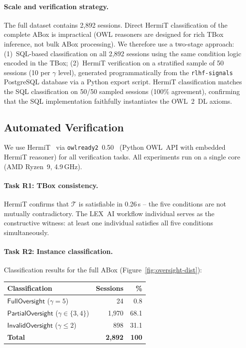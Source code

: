 \documentclass[11pt]{article}
\newcommand{\TBox}{\ensuremath{\mathcal{T}}\xspace}
\begin{document}
\paragraph{Scale and verification strategy.}
The full dataset contains 2{,}892 sessions.
Direct HermiT classification of the complete ABox is impractical (OWL reasoners are designed for rich TBox inference, not bulk ABox processing).
We therefore use a two-stage approach: (1)~SQL-based classification on all 2{,}892 sessions using the same condition logic encoded in the TBox; (2)~HermiT verification on a stratified sample of 50 sessions (10 per $\gamma$ level), generated programmatically from the \texttt{rlhf-signals} PostgreSQL database via a Python export script.
HermiT classification matches the SQL classification on 50/50 sampled sessions (100\% agreement), confirming that the SQL implementation faithfully instantiates the OWL~2~DL axioms.

\subsection{Automated Verification}
\label{sec:verification}

We use HermiT~\citep{glimm2014hermit} via \texttt{owlready2}~0.50~\citep{lamy2017owlready} (Python OWL~API with embedded HermiT reasoner) for all verification tasks.
All experiments run on a single core (AMD Ryzen~9, 4.9\,GHz).

\paragraph{Task R1: TBox consistency.}
HermiT confirms that \TBox is satisfiable in 0.26\,s -- the five conditions are not mutually contradictory.
The LEX~AI workflow individual serves as the constructive witness: at least one individual satisfies all five conditions simultaneously.

\paragraph{Task R2: Instance classification.}
Classification results for the full ABox (Figure~\ref{fig:oversight-dist}):

\begin{center}
\begin{tabular}{@{}lrr@{}}
\toprule
\textbf{Classification} & \textbf{Sessions} & \textbf{\%} \\
\midrule
$\mathsf{FullOversight}$    ($\gamma = 5$) & 24 & 0.8 \\
$\mathsf{PartialOversight}$ ($\gamma \in \{3,4\}$) & 1{,}970 & 68.1 \\
$\mathsf{InvalidOversight}$ ($\gamma \leq 2$) & 898 & 31.1 \\
\midrule
\textbf{Total} & \textbf{2{,}892} & \textbf{100} \\
\bottomrule
\end{tabular}
\end{center}
\end{document}
